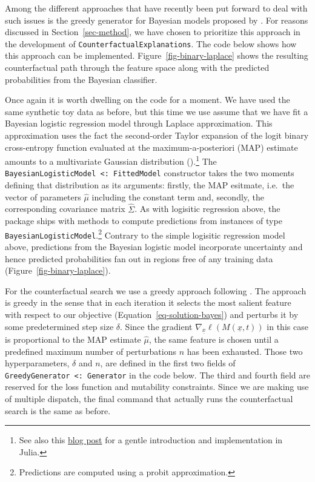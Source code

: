 \documentclass{juliacon}
\begin{document}
Among the different approaches that have recently been put forward to
deal with such issues is the greedy generator for Bayesian models
proposed by \cite{schut2021generating}. For reasons discussed in
Section~\ref{sec-method}, we have chosen to prioritize this approach in
the development of \texttt{CounterfactualExplanations}. The code below
shows how this approach can be implemented.
Figure~\ref{fig-binary-laplace} shows the resulting counterfactual path
through the feature space along with the predicted probabilities from
the Bayesian classifier.

Once again it is worth dwelling on the code for a moment. We have used
the same synthetic toy data as before, but this time we use assume that
we have fit a Bayesian logistic regression model through Laplace
approximation. This approximation uses the fact the second-order Taylor
expansion of the logit binary cross-entropy function evaluated at the
maximum-a-posteriori (MAP) estimate amounts to a multivariate Gaussian
distribution (\cite{murphy2022probabilistic}).\footnote{See also this
  \href{https://www.paltmeyer.com/blog/posts/effortsless-bayesian-dl/}{blog
  post} for a gentle introduction and implementation in Julia.} The
\texttt{BayesianLogisticModel\ \textless{}:\ FittedModel} constructor
takes the two moments defining that distribution as its arguments:
firstly, the MAP esitmate, i.e.~the vector of parameters \(\hat\mu\)
including the constant term and, secondly, the corresponding covariance
matrix \(\hat{\Sigma}\). As with logisitic regression above, the package
ships with methods to compute predictions from instances of type
\texttt{BayesianLogisticModel}.\footnote{Predictions are computed using
  a probit approximation.} Contrary to the simple logisitic regression
model above, predictions from the Bayesian logistic model incorporate
uncertainty and hence predicted probabilities fan out in regions free of
any training data (Figure~\ref{fig-binary-laplace}).

For the counterfactual search we use a greedy approach following
\cite{schut2021generating}. The approach is greedy in the sense that in
each iteration it selects the most salient feature with respect to our
objective (Equation~\ref{eq-solution-bayes}) and perturbs it by some
predetermined step size \(\delta\). Since the gradient
\(\nabla_{\underline{x}}\ell(M(\underline{x},t))\) in this case is
proportional to the MAP estimate \(\hat\mu\), the same feature is chosen
until a predefined maximum number of perturbations \(n\) has been
exhausted. Those two hyperparameters, \(\delta\) and \(n\), are defined
in the first two fields of
\texttt{GreedyGenerator\ \textless{}:\ Generator} in the code below. The
third and fourth field are reserved for the loss function and mutability
constraints. Since we are making use of multiple dispatch, the final
command that actually runs the counterfactual search is the same as
before.
\end{document}
